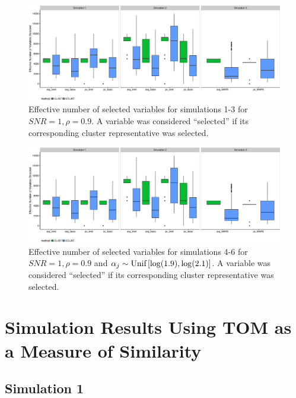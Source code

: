 \begin{figure}[H]
	\centering
	\includegraphics[width=1\linewidth, keepaspectratio]{./figs/guillimin/results/figures/sim4-5-6-combined/Shat_sim123.eps}
	\caption{Effective number of selected variables for simulations 1-3 for $SNR = 1, \rho=0.9$. A variable was considered ``selected'' if its corresponding cluster representative was selected.}
	\label{fig:compare_clusters2}
\end{figure}

\begin{figure}[H]
	\centering
	\includegraphics[width=1\linewidth, keepaspectratio]{./figs/guillimin/results/figures/sim4-5-6-combined/Shat_sim123.eps}
	\caption{Effective number of selected variables for simulations 4-6 for $SNR = 1, \rho=0.9$ and \mbox{$\alpha_{j} \sim \textrm{{Unif}}\left[\log(1.9), \log(2.1)\right]$}. A variable was considered ``selected'' if its corresponding cluster representative was selected.}
	\label{fig:compare_clusters3}
\end{figure}


\section{Simulation Results Using TOM as a Measure of Similarity} \label{ap:sim-TOM}


\subsection*{Simulation 1}

